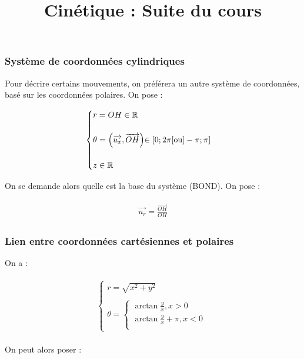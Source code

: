 \documentclass{article}
\title{Cinétique : Suite du cours}
\date{}
\begin{document}
\subsubsection{Système de coordonnées cylindriques}


Pour décrire certains mouvements, on préférera un autre système de coordonnées, basé sur les coordonnées polaires. On pose :

\begin{align*}\begin{split}
\begin{cases}
    r = OH\in\mathbb{R}\\\\
    \theta = \Bigl(\overrightarrow{u_x},\overrightarrow{OH}\Bigl)\in[0;2\pi[ \text{ou} ]-\pi;\pi]\\\\
    z\in\mathbb{R}
\end{cases}
\end{split}\end{align*}

On se demande alors quelle est la base du système (BOND). On pose :

\begin{align*}\begin{split}
\overrightarrow{u_r}=\frac{\overrightarrow{OH}}{OH}
\end{split}\end{align*}

\bigskip
\bigskip

\subsubsection*{Lien entre coordonnées cartésiennes et polaires}

On a :

\begin{align*}\begin{split}
\begin{cases}
    r=\sqrt{x^2+y^2}\\\\
    \theta=\begin{cases}
        \arctan\frac{y}{x},x>0\\
        \arctan\frac{y}{x}+\pi,x<0\\
    \end{cases}
\end{cases}
\end{split}\end{align*}

On peut alors poser :
\end{document}
